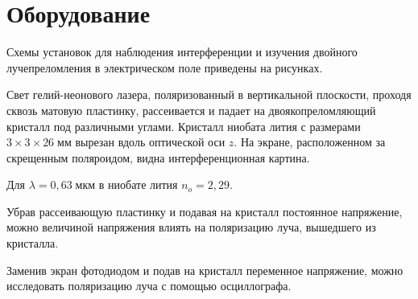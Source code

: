 \section{Оборудование}
\begin{figure}[ht!]
\end{figure}
\begin{figure}[ht!]
\end{figure}

Схемы установок для наблюдения интерференции и изучения двойного лучепреломления в электрическом поле приведены на рисунках.

 Свет гелий-неонового лазера, поляризованный в вертикальной плоскости, проходя сквозь матовую пластинку, рассеивается и падает на двоякопреломляющий кристалл под различными углами. Кристалл ниобата лития с размерами $3 \times 3 \times 26\;\text{мм}$ вырезан вдоль оптической оси $z$. На экране, расположенном за скрещенным поляроидом, видна интерференционная картина.

 Для $\lambda = 0{,}63\;\text{мкм}$ в ниобате лития $n_{o} = 2{,}29$.

 Убрав рассеивающую пластинку и подавая на кристалл постоянное напряжение, можно величиной напряжения влиять на поляризацию луча, вышедшего из кристалла.

 Заменив экран фотодиодом и подав на кристалл переменное напряжение, можно исследовать поляризацию луча с помощью осциллографа.
